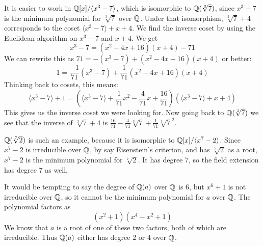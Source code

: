 \protect \documentclass [10pt]{exam}
\renewenvironment{Ans}[1]{\setcounter{question}{#1}\addtocounter{question}{-1}\question }{}
\begin{document}
\begin{questions}
\begin{Ans}{2}
\end{Ans}
\begin{Ans}{3}
It is easier to work in $\mathbb Q[x]/\langle x^3 - 7\rangle$, which is isomorphic to $\mathbb Q(\sqrt[3]{7})$, since $x^3 - 7$ is the minimum polynomial for $\sqrt[3]{7}$ over $\mathbb Q$.  Under that isomorphism, $\sqrt[3]{7} + 4$ corresponds to the coset $\langle x^3 - 7\rangle + x + 4$.  We find the inverse coset by using the Euclidean algorithm on $x^3 -7$ and $x+4$.  We get
\[x^3-7 = (x^2 - 4x + 16)(x+4) - 71\]
We can rewrite this as $71 = -(x^3 - 7) + (x^2 - 4x + 16)(x+4)$ or better:
\[1 = \frac{-1}{71}(x^3- 7) + \frac{1}{71}(x^2 - 4x + 16)(x+4)\]
Thinking back to cosets, this means:
\[\langle x^3 -7\rangle + 1 = (\langle x^3 - 7\rangle + \frac{1}{71}x^2 - \frac{4}{71}x + \frac{16}{71})(\langle x^3 - 7\rangle + x+4)\]
This gives us the inverse coset we were looking for.  Now going back to $\mathbb Q(\sqrt[3]{7})$ we see that the inverse of $\sqrt[3]{7} + 4$ is $\frac{16}{71} -\frac{4}{71}\sqrt[3]{7} + \frac{1}{71}\sqrt[3]{7}^2$.
\end{Ans}
\begin{Ans}{4}
 $\mathbb Q(\sqrt[7]{2})$ is such an example, because it is isomorphic to $\mathbb Q[x]/\langle x^7 - 2\rangle$.  Since $x^7 - 2$ is irreducible over $\mathbb Q$, by say Eisenstein's criterion, and has $\sqrt[7]{2}$ as a root, $x^7-2$ is the minimum polynomial for $\sqrt[7]{2}$.  It has degree 7, so the field extension has degree 7 as well.
\end{Ans}
\begin{Ans}{5}
It would be tempting to say the degree of $\mathbb Q(a)$ over $\mathbb Q$ is 6, but $x^6 + 1$ is not irreducible over $\mathbb Q$, so it cannot be the minimum polynomial for $a$ over $\mathbb Q$.  The polynomial factors as
\[(x^2 + 1)(x^4 - x^2 + 1)\]
We know that $a$ is a root of one of these two factors, both of which are irreducible.  Thus $\mathbb Q(a)$ either has degree 2 or 4 over $\mathbb Q$.
\end{Ans}
\begin{Ans}{6}
\end{Ans}
\end{questions}
\end{document}
